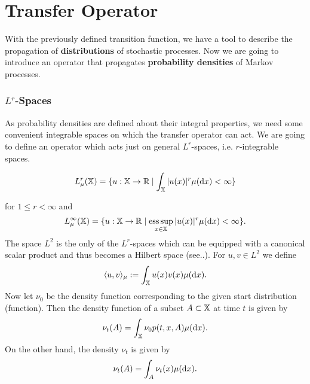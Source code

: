 \section{Transfer Operator}
\label{sec:transfer}

With the previously defined transition function, we have a tool to describe the propagation of \textbf{distributions} of stochastic processes. Now we are going to introduce an operator that propagates \textbf{probability densities} of Markov processes.

\subsubsection*{$L^r$-Spaces}

As probability densities are defined about their integral properties,
we need some convenient integrable spaces on which the transfer operator can act.
We are going to define an operator which acts just on general $L^r$-spaces, i.e. $r$-integrable spaces.

\begin{defi}[$L^r$-Spaces]
\begin{equation}
L_\mu^r(\mathbb{X}) = \{ u: \mathbb{X} \rightarrow \mathbb{R} \mid \int_{\mathbb{X}} |u(x)|^r \mu(\mathop{}\!\mathrm{d} x) < \infty \}
\end{equation}
\end{defi}
for $1 \leq r < \infty$ and
\begin{equation}
L_\mu^\infty(\mathbb{X}) = \{ u: \mathbb{X} \rightarrow \mathbb{R} \mid \operatorname*{ess\,sup}_{x\in\mathbb{X}} |u(x)|^r \mu(\mathop{}\!\mathrm{d} x) < \infty \}.
\end{equation}
The space $L^2$ is the only of the $L^r$-spaces which can be equipped with a canonical scalar product and thus becomes a Hilbert space (see..). For $u,v \in L^2$ we define 
\begin{equation}
\langle u,v \rangle_\mu := \int_{\mathbb{X}} u(x)v(x) \mu(\mathop{}\!\mathrm{d} x).
\end{equation}
Now let $\nu_0$ be the density function corresponding to the given start distribution (function). Then the density function of a subset $A \subset \mathbb{X}$ at time $t$ is given by
\begin{equation}
\nu_t(A) = \int_{\mathbb{X}} \nu_0 p(t,x,A) \mu(\mathop{}\!\mathrm{d} x).
\end{equation}
On the other hand, the density $\nu_t$ is given by
\begin{equation}
\nu_t(A) = \int_A \nu_t(x) \mu(\mathop{}\!\mathrm{d} x).
\end{equation}

